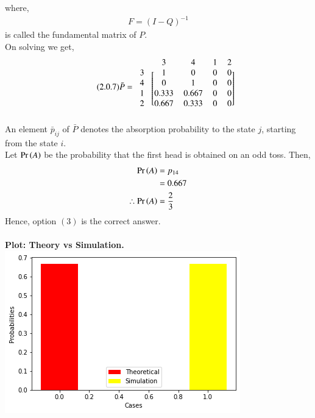 \documentclass[journal,12pt,twocolumn]{IEEEtran}
\begin{document}
where,
\begin{align}
\tag{2.0.6}
\label{eq:2.0.6}
    F=(I-Q)^{-1}
\end{align}
is called the fundamental matrix of $P$. \\
On solving we get,
\begin{align}
    \tag{2.0.7}
    \label{eq:2.0.7}
    \bar P = \begin{blockarray}{ccccc}
    &3 &4 &1 &2\\
    \begin{block}{c[cccc]}
    3 & 1 & 0 & 0 & 0\\
    4 & 0 & 1 & 0 & 0\\
    1 & 0.333 & 0.667 & 0 & 0\\
    2 & 0.667 & 0.333 & 0 & 0\\
    \end{block}
    \end{blockarray}
\end{align}
An element $\bar p_{ij}$ of $\bar P$ denotes the absorption probability to the state $j$, starting from the state $i$.
\\Let $\Pr\left(A\right)$ be the probability that the first head is obtained on an odd toss. Then,
\begin{align}
    \Pr\left(A\right) &= p_{14}\\
    &= 0.667\\
    \therefore \Pr\left(A\right) &= \frac{2}{3}
\end{align}
Hence, option $(3)$ is the correct answer. \\\\
\textbf{Plot: Theory vs Simulation.}
\centering
\includegraphics[scale=0.65]{figures/sim_plot.png}
\end{document}

